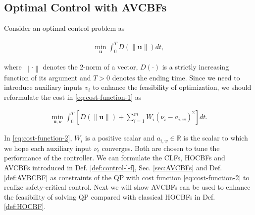 \subsection{Optimal Control with AVCBFs}
\label{subsec: optimal-control}
Consider an optimal control problem as
\begin{small}
\begin{equation}
\label{eq:cost-function-1}
\begin{split}
 \min_{\boldsymbol{u}} \int_{0}^{T} 
 D(\left \| \boldsymbol{u} \right \| )dt,
\end{split}
\end{equation}
\end{small}
where $\left \| \cdot \right \|$ denotes the 2-norm of a vector, $D(\cdot)$ is a strictly increasing function of its argument and $T>0$ denotes the ending time. Since we need to introduce auxiliary inputs $v_{i}$ to enhance the feasibility of optimization, we should reformulate the cost in \eqref{eq:cost-function-1} as
\begin{small}
\begin{equation}
\label{eq:cost-function-2}
\begin{split}
 \min_{\boldsymbol{u},\boldsymbol{\nu}} \int_{0}^{T} 
 [D(\left \| \boldsymbol{u} \right \| )+\sum_{i=1}^{m}W_{i}(\nu_{i}-a_{i,w})^{2}]dt.
\end{split}
\end{equation}
\end{small}
In \eqref{eq:cost-function-2}, $W_{i}$ is a positive scalar and $a_{i,w}\in \mathbb{R}$ is the scalar to which we hope each auxiliary input $\nu_{i}$ converges. Both are chosen to tune the performance of the controller. We can formulate the CLFs, HOCBFs and AVCBFs introduced in Def. \ref{def:control-l-f}, Sec. \ref{sec:AVCBFs} and Def. \ref{def:AVBCBF} as constraints of the QP with cost function \eqref{eq:cost-function-2} to realize safety-critical control. Next we will show AVCBFs can be used to enhance the feasibility of solving QP compared with classical HOCBFs in Def. \ref{def:HOCBF}.

